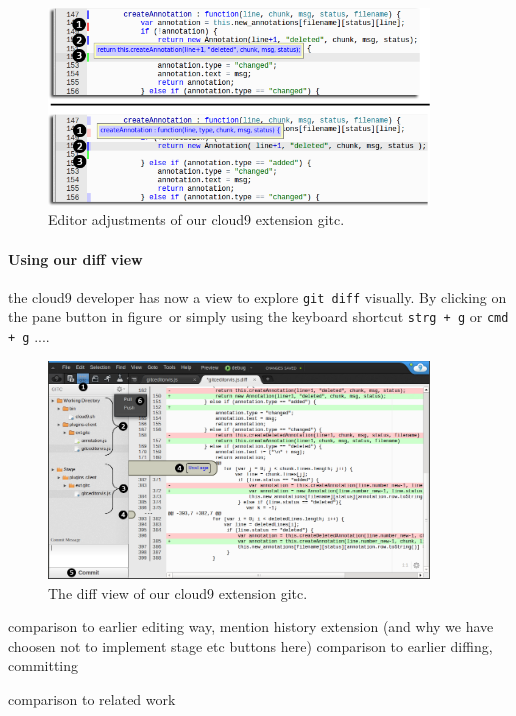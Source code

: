 \begin{figure}
   \centering
   \includegraphics[width=0.9\textwidth]{images/extension_tooltip_comparison.png}
   \caption{Editor adjustments of our cloud9 extension gitc.}
   \label{fig:editor}
\end{figure}

\paragraph{Using our diff view} the cloud9 developer has now a view to explore \texttt{git diff} visually.
By clicking on the pane button  in figure~\needcite or simply using the keyboard shortcut \texttt{strg + g} or \texttt{cmd + g} ....

\begin{figure}
   \centering
   \includegraphics[width=0.9\textwidth]{images/extension_unstage.png}
   \caption{The diff view of our cloud9 extension gitc.}
   \label{fig:diff_view}
\end{figure}

comparison to earlier editing way, mention history extension (and why we have choosen not to implement stage etc buttons here)
comparison to earlier diffing, committing

comparison to related work

